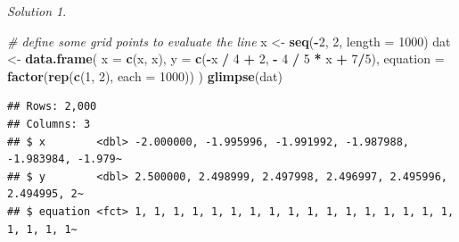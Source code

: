 \documentclass[
]{book}
\newenvironment{Shaded}{\begin{snugshade}}{\end{snugshade}}
\newcommand{\CommentTok}[1]{\textcolor[rgb]{0.56,0.35,0.01}{\textit{#1}}}
\newcommand{\DataTypeTok}[1]{\textcolor[rgb]{0.13,0.29,0.53}{#1}}
\newcommand{\DecValTok}[1]{\textcolor[rgb]{0.00,0.00,0.81}{#1}}
\newcommand{\FloatTok}[1]{\textcolor[rgb]{0.00,0.00,0.81}{#1}}
\newcommand{\KeywordTok}[1]{\textcolor[rgb]{0.13,0.29,0.53}{\textbf{#1}}}
\newcommand{\NormalTok}[1]{#1}
\newcommand{\OperatorTok}[1]{\textcolor[rgb]{0.81,0.36,0.00}{\textbf{#1}}}
\newcommand{\StringTok}[1]{\textcolor[rgb]{0.31,0.60,0.02}{#1}}
\theoremstyle{definition}
\theoremstyle{definition}
\theoremstyle{definition}
\theoremstyle{definition}
\theoremstyle{remark}
\newtheorem*{solution}{Solution}
\begin{document}
\begin{solution}
\begin{Shaded}
\begin{Highlighting}[]
\CommentTok{# define some grid points to evaluate the line}
\NormalTok{x <-}\StringTok{ }\KeywordTok{seq}\NormalTok{(}\OperatorTok{-}\DecValTok{2}\NormalTok{, }\DecValTok{2}\NormalTok{, }\DataTypeTok{length =} \DecValTok{1000}\NormalTok{)}
\NormalTok{dat <-}\StringTok{ }\KeywordTok{data.frame}\NormalTok{(}
    \DataTypeTok{x =} \KeywordTok{c}\NormalTok{(x, x),}
    \DataTypeTok{y =} \KeywordTok{c}\NormalTok{(}\OperatorTok{-}\NormalTok{x }\OperatorTok{/}\StringTok{ }\DecValTok{4} \OperatorTok{+}\StringTok{ }\DecValTok{2}\NormalTok{, }\OperatorTok{-}\StringTok{ }\DecValTok{4} \OperatorTok{/}\StringTok{ }\DecValTok{5} \OperatorTok{*}\StringTok{ }\NormalTok{x }\OperatorTok{+}\StringTok{ }\DecValTok{7}\OperatorTok{/}\DecValTok{5}\NormalTok{),}
    \DataTypeTok{equation =} \KeywordTok{factor}\NormalTok{(}\KeywordTok{rep}\NormalTok{(}\KeywordTok{c}\NormalTok{(}\DecValTok{1}\NormalTok{, }\DecValTok{2}\NormalTok{), }\DataTypeTok{each =} \DecValTok{1000}\NormalTok{))}
\NormalTok{)}
\KeywordTok{glimpse}\NormalTok{(dat)}
\end{Highlighting}
\end{Shaded}

\begin{verbatim}
## Rows: 2,000
## Columns: 3
## $ x        <dbl> -2.000000, -1.995996, -1.991992, -1.987988, -1.983984, -1.979~
## $ y        <dbl> 2.500000, 2.498999, 2.497998, 2.496997, 2.495996, 2.494995, 2~
## $ equation <fct> 1, 1, 1, 1, 1, 1, 1, 1, 1, 1, 1, 1, 1, 1, 1, 1, 1, 1, 1, 1, 1~
\end{verbatim}

\begin{Shaded}
\end{Shaded}


\end{solution}
\end{document}
